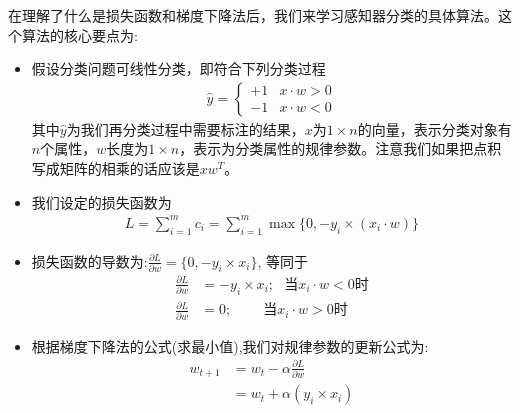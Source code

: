 \documentclass[12pt]{article}
\numberwithin{figure}{section}
\numberwithin{equation}{section}
\begin{document}
在理解了什么是损失函数和梯度下降法后，我们来学习感知器分类的具体算法。这个算法的核心要点为:
\begin{itemize}
	\item 假设分类问题可线性分类，即符合下列分类过程 \begin{align*}
		\hat{y} = \begin{cases}
			+1 & x \cdot w > 0 \\
			-1 & x \cdot w < 0
		\end{cases}
	\end{align*}
	其中$\hat{y}$为我们再分类过程中需要标注的结果，$x$为$1\times n$的向量，表示分类对象有$n$个属性，$w$长度为$1 \times n$，表示为分类属性的规律参数。注意我们如果把点积写成矩阵的相乘的话应该是$x w^T$。
	\item 我们设定的损失函数为 \begin{align*}
		L = \sum_{i=1}^m c_i = \sum_{i=1}^m \max \{ 0, - y_i \times (x_i \cdot w) \} 
	\end{align*}
	\item 损失函数的导数为:$\frac{\partial L}{\partial w} = \{ 0, -y_i \times x_i \}$, 等同于
	\begin{align*}
		\frac{\partial L}{\partial w} & = - y_i \times x_i; \ \ \ \text{当$x_i \cdot w < 0$时} \\
		\frac{\partial L}{\partial w} & = 0; \ \ \ \ \ \ \ \ \ \ \text{当$x_i \cdot w > 0$时}
	\end{align*}
	\item 根据梯度下降法的公式(求最小值),我们对规律参数的更新公式为: \begin{align*}
		w_{t+1} & = w_{t} - \alpha \frac{\partial L}{\partial w} \\
		& = w_{t} + \alpha (y_i \times x_i) \tag{向量更新公式2.1}
	\end{align*}
\end{itemize}
\end{document}
